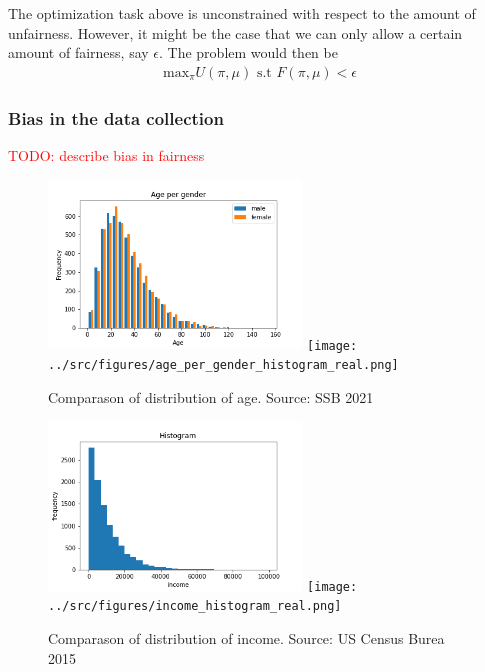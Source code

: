 The optimization task above is unconstrained with respect to the amount of unfairness. 
However, it might be the case that we can only allow a certain amount of fairness, say $\epsilon$. 
The problem would then be 
\begin{align*}
    \text{max}_{\pi} U(\pi,\mu) \text{ s.t } F(\pi,\mu) < \epsilon
\end{align*}



\subsubsection*{Bias in the data collection}
\textcolor{red}{TODO: describe bias in fairness}


\begin{figure}
    \includegraphics[width=0.6\textwidth]{../src/figures/age_per_gender.png} 
    \texttt{[image: ../src/figures/age\_per\_gender\_histogram\_real.png]} 
    \caption{Comparason of distribution of age. Source: SSB 2021}
    \label{Age_comparison}
\end{figure}

\begin{figure}
    \includegraphics[width=0.6\textwidth]{../src/figures/income_histogram.png} 
    \texttt{[image: ../src/figures/income\_histogram\_real.png]} 
    \caption{Comparason of distribution of income. Source: US Census Burea 2015}
    \label{Income_comparison}
\end{figure}



